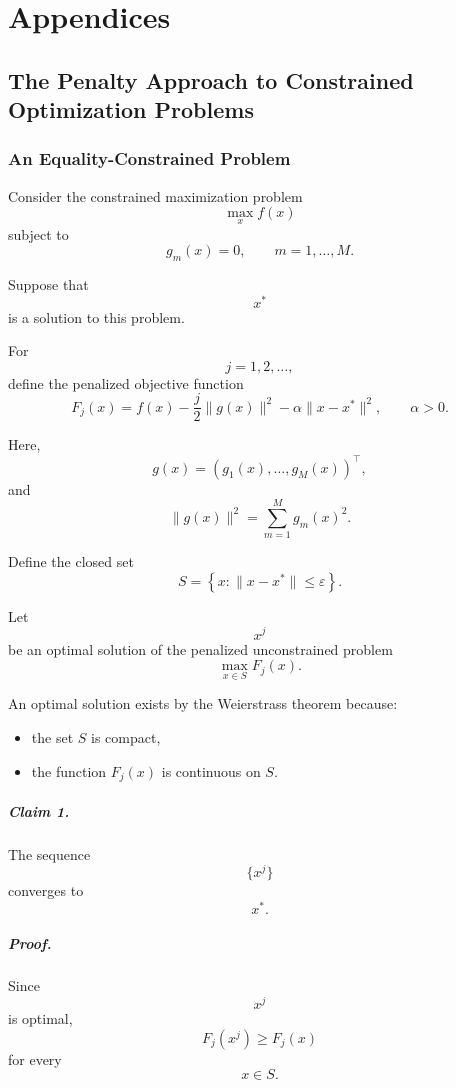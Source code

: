 \chapter{Appendices}


\section{The Penalty Approach to Constrained Optimization Problems}

\subsection{An Equality-Constrained Problem}

Consider the constrained maximization problem
\[
\max_x f(x)
\]
subject to
\[
g_m(x)=0,
\qquad
m=1,\dots,M.
\]

Suppose that
\[
x^*
\]
is a solution to this problem.

For
\[
j=1,2,\dots,
\]
define the penalized objective function
\[
F_j(x)
=
f(x)
-
\frac{j}{2}\|g(x)\|^2
-
\alpha\|x-x^*\|^2,
\qquad
\alpha>0.
\]

Here,
\[
g(x)
=
(g_1(x),\dots,g_M(x))^\top,
\]
and
\[
\|g(x)\|^2
=
\sum_{m=1}^M g_m(x)^2.
\]

Define the closed set
\[
S
=
\left\{
x:\|x-x^*\|\le \varepsilon
\right\}.
\]

Let
\[
x^j
\]
be an optimal solution of the penalized unconstrained problem
\[
\max_{x\in S}F_j(x).
\]

An optimal solution exists by the Weierstrass theorem because:

\begin{itemize}
    \item the set \(S\) is compact,
    \item the function \(F_j(x)\) is continuous on \(S\).
\end{itemize}

\paragraph{Claim 1.}

The sequence
\[
\{x^j\}
\]
converges to
\[
x^*.
\]

\paragraph{Proof.}

Since
\[
x^j
\]
is optimal,
\[
F_j(x^j)\ge F_j(x)
\]
for every
\[
x\in S.
\]

